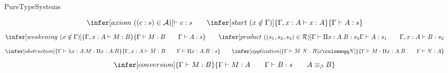 \calculusAcronym{}    



\maketitle

\begin{entry}{PureTypeSystems}



\newcommand{\sorts}{\mathcal{S}}
\newcommand{\axioms}{\mathcal{A}}
\newcommand{\rules}{\mathcal{R}}
\newcommand{\variables}{\mathcal{V}}
\newcommand{\constants}{\mathcal{C}}
\newcommand{\terms}{\mathcal{T}}

\newcommand{\union}{\cup}

\newcommand{\Prop}{\ast}
\newcommand{\Type}{\square}
\newcommand{\Kind}{\triangle}

\newcommand{\entails}{\vdash}

\newcommand{\negvspace}{\vspace{-1ex}}

\begin{calculus}

\negvspace
\[ \infer[axiom\ ((c : s) \in \axioms)]{\entails c : s}{ } \qquad
   \infer[start\ (x \not\in \Gamma)]{\Gamma, x : A \entails x : A}{\Gamma \entails A : s} \]
\[
 \infer[weakening\ (x\not\in\Gamma)]{\Gamma, x : A \entails M : B}{\Gamma \entails M : B \qquad \Gamma \entails A : s} \qquad
 \infer[product\ ((s_1,s_2,s_3)\in\rules)]{\Gamma \entails \Pi x : A. B : s_3}{\Gamma \entails A : s_1 \qquad \Gamma, x : A \entails B : s_2} \]
\[ \infer[abstraction]{\Gamma \entails \lambda x: A. M : \Pi x : A. B}{\Gamma, x : A \entails M : B \qquad \Gamma \entails \Pi x : A. B : s} \qquad
\infer[application]{\Gamma \entails M~N : B[x \coloneqq N]}{\Gamma \entails M : \Pi x : A. B \qquad \Gamma \entails N : A} \]
\[ \infer[conversion]{\Gamma \entails M : B}{\Gamma \entails M : A \qquad \Gamma \entails B : s \qquad A \equiv_\beta B} \]

\vspace{5pt}

\end{calculus}


\end{entry}
